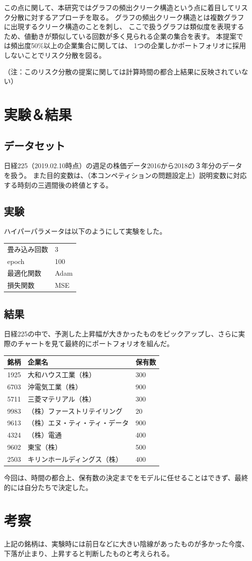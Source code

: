 \documentclass[twocolumn,10.5pt]{article}           %
\begin{document}
この点に関して、本研究ではグラフの頻出クリーク構造という点に着目してリスク分散に対するアプローチを取る。
グラフの頻出クリーク構造とは複数グラフに出現するクリーク構造のことを刺し、
ここで扱うグラフは類似度を表現するため、値動きが類似している回数が多く見られる企業の集合を表す。
本提案では頻出度50\%以上の企業集合に関しては、
1つの企業しかポートフォリオに採用しないことでリスク分散を図る。

（注：このリスク分散の提案に関しては計算時間の都合上結果に反映されていない）

\section{実験＆結果}
\subsection{データセット}
日経225（2019.02.10時点）の週足の株価データ2016から2018の３年分のデータを扱う。
また目的変数は、（本コンペティションの問題設定上）説明変数に対応する時刻の三週間後の終値とする。
\subsection{実験}
ハイパーパラメータは以下のようにして実験をした。
\begin{table}[htb]
	\begin{tabular}{ll} \hline
	畳み込み回数 & 3 \\
	epoch & 100 \\
	最適化関数 & Adam \\
	損失関数 & MSE \\  \hline
	\end{tabular}
\end{table}

\subsection{結果}
日経225の中で、予測した上昇幅が大きかったものをピックアップし、さらに実際のチャートを見て最終的にポートフォリオを組んだ。
\begin{table}[htb]
	\begin{tabular}{lll} \hline
	銘柄 & 企業名 & 保有数 \\ \hline
	1925 & 大和ハウス工業（株）& 300 \\
	6703 & 沖電気工業（株）& 900 \\
	5711 & 三菱マテリアル（株）& 300\\
	9983 & （株）ファーストリテイリング & 20\\
	9613 & （株）エヌ・ティ・ティ・データ& 900	\\
	4324 & （株）電通 & 400	\\
	9602 & 東宝（株）& 500 \\
	2503 & キリンホールディングス（株）& 400\\ \hline
	\end{tabular}
\end{table}
今回は、時間の都合上、保有数の決定までをモデルに任せることはできず、最終的には自分たちで決定した。
\section{考察}
上記の銘柄は、実験時には前日などに大きい陰線があったものが多かった今度、下落が止まり、上昇すると判断したものと考えられる。

\end{document}
